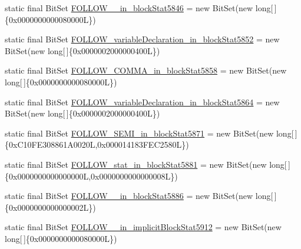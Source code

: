 \begin{DoxyCompactItemize}
\item 
static final Bit\-Set \hyperlink{classorg_1_1tzi_1_1use_1_1parser_1_1testsuite_1_1_test_suite_parser_a920df0b47ca532f149119033929eda52}{F\-O\-L\-L\-O\-W\-\_\-\_\-in\-\_\-block\-Stat5846} = new Bit\-Set(new long\mbox{[}$\,$\mbox{]}\{0x0000000000080000\-L\})
\item 
static final Bit\-Set \hyperlink{classorg_1_1tzi_1_1use_1_1parser_1_1testsuite_1_1_test_suite_parser_a5303f842cf81163d035ea2a1d5a3f91e}{F\-O\-L\-L\-O\-W\-\_\-variable\-Declaration\-\_\-in\-\_\-block\-Stat5852} = new Bit\-Set(new long\mbox{[}$\,$\mbox{]}\{0x0000002000000400\-L\})
\item 
static final Bit\-Set \hyperlink{classorg_1_1tzi_1_1use_1_1parser_1_1testsuite_1_1_test_suite_parser_abcf7ffa045f79a2a6ab89aa1636aaa1e}{F\-O\-L\-L\-O\-W\-\_\-\-C\-O\-M\-M\-A\-\_\-in\-\_\-block\-Stat5858} = new Bit\-Set(new long\mbox{[}$\,$\mbox{]}\{0x0000000000080000\-L\})
\item 
static final Bit\-Set \hyperlink{classorg_1_1tzi_1_1use_1_1parser_1_1testsuite_1_1_test_suite_parser_a12a094e106206c65913946e801cd0ca3}{F\-O\-L\-L\-O\-W\-\_\-variable\-Declaration\-\_\-in\-\_\-block\-Stat5864} = new Bit\-Set(new long\mbox{[}$\,$\mbox{]}\{0x0000002000000400\-L\})
\item 
static final Bit\-Set \hyperlink{classorg_1_1tzi_1_1use_1_1parser_1_1testsuite_1_1_test_suite_parser_ad64f24ec4fc511bab931c4965be76069}{F\-O\-L\-L\-O\-W\-\_\-\-S\-E\-M\-I\-\_\-in\-\_\-block\-Stat5871} = new Bit\-Set(new long\mbox{[}$\,$\mbox{]}\{0x\-C10\-F\-E308861\-A0020\-L,0x000014183\-F\-E\-C2580\-L\})
\item 
static final Bit\-Set \hyperlink{classorg_1_1tzi_1_1use_1_1parser_1_1testsuite_1_1_test_suite_parser_abc05b425ee9e9d175236d4292010ec87}{F\-O\-L\-L\-O\-W\-\_\-stat\-\_\-in\-\_\-block\-Stat5881} = new Bit\-Set(new long\mbox{[}$\,$\mbox{]}\{0x0000000000000000\-L,0x0000000000000008\-L\})
\item 
static final Bit\-Set \hyperlink{classorg_1_1tzi_1_1use_1_1parser_1_1testsuite_1_1_test_suite_parser_adb8e2e6dda24d0ff296f10da3ba665d3}{F\-O\-L\-L\-O\-W\-\_\-\_\-in\-\_\-block\-Stat5886} = new Bit\-Set(new long\mbox{[}$\,$\mbox{]}\{0x0000000000000002\-L\})
\item 
static final Bit\-Set \hyperlink{classorg_1_1tzi_1_1use_1_1parser_1_1testsuite_1_1_test_suite_parser_a01d6c004480a342016e13d06f94b3578}{F\-O\-L\-L\-O\-W\-\_\-\_\-in\-\_\-implicit\-Block\-Stat5912} = new Bit\-Set(new long\mbox{[}$\,$\mbox{]}\{0x0000000000080000\-L\})
\item 

\end{DoxyCompactItemize}
